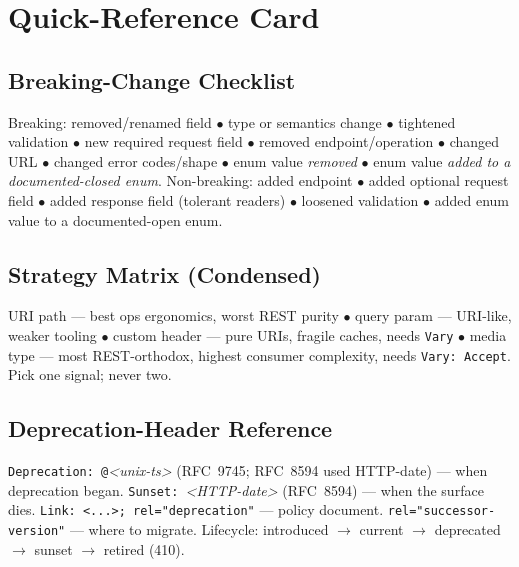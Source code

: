 \section{Quick-Reference Card}
\label{sec:ch9-quickref}

\subsection*{Breaking-Change Checklist}
Breaking: removed/renamed field $\bullet$ type or semantics change $\bullet$
tightened validation $\bullet$ new required request field $\bullet$ removed
endpoint/operation $\bullet$ changed URL $\bullet$ changed error
codes/shape $\bullet$ enum value \emph{removed} $\bullet$ enum value
\emph{added to a documented-closed enum}. Non-breaking: added endpoint
$\bullet$ added optional request field $\bullet$ added response field
(tolerant readers) $\bullet$ loosened validation $\bullet$ added enum value
to a documented-open enum.

\subsection*{Strategy Matrix (Condensed)}
URI path --- best ops ergonomics, worst REST purity $\bullet$ query param ---
URI-like, weaker tooling $\bullet$ custom header --- pure URIs, fragile
caches, needs \texttt{Vary} $\bullet$ media type --- most REST-orthodox,
highest consumer complexity, needs \texttt{Vary: Accept}. Pick one signal;
never two.

\subsection*{Deprecation-Header Reference}
\texttt{Deprecation: @}\emph{<unix-ts>} (RFC~9745; RFC~8594 used HTTP-date)
--- when deprecation began. \texttt{Sunset: }\emph{<HTTP-date>} (RFC~8594)
--- when the surface dies. \texttt{Link: <...>; rel="deprecation"} --- policy
document. \texttt{rel="successor-version"} --- where to migrate. Lifecycle:
introduced $\to$ current $\to$ deprecated $\to$ sunset $\to$ retired (410).


